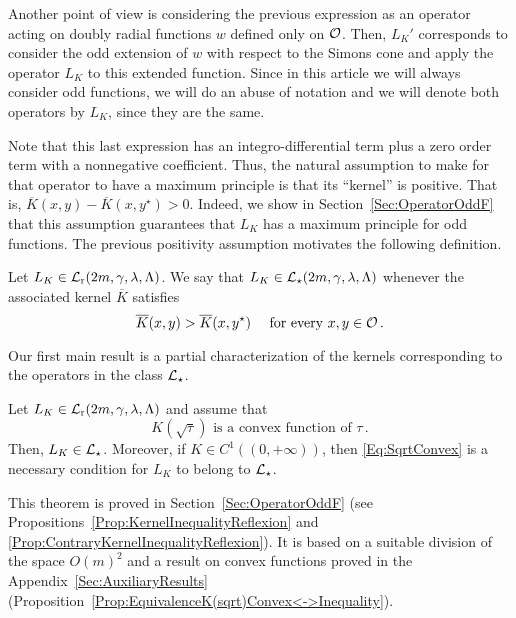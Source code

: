 Another point of view is considering the previous expression as an operator acting on doubly radial functions $w$ defined only on $\mathcal{O}$. Then, $L_K'$ corresponds to consider the odd extension of  $w$ with respect to the Simons cone and apply the operator $L_K$ to this extended function. Since in this article we will always consider odd functions, we will do an abuse of notation and we will denote both operators by $L_K$, since they are the same.

Note that this last expression has an integro-differential term plus a zero order term with a nonnegative coefficient. Thus, the natural assumption to make for that operator to have a maximum principle is that its ``kernel'' is positive. That is, $\overline{K}(x, y) - \overline{K}(x, y^\star)>0$. Indeed, we show in Section~\ref{Sec:OperatorOddF} that this assumption guarantees that $L_K$ has a maximum principle for odd functions. The previous positivity assumption motivates the following definition.

\begin{definition}
	Let $L_K \in \mathcal{L}_{\mathrm{r}}(2m,\gamma,\lambda, \Lambda)$. We say that $L_K\in \mathcal{L}_\star (2m,\gamma,\lambda, \Lambda)$ whenever the associated kernel $\overline{K}$ satisfies
	\begin{equation}
		\label{Eq:KernelInequality}
		\overline{K}(x,y) > \overline{K}(x, y^\star) \quad \text{ for every }x,y \in \mathcal{O}\,.
	\end{equation}
\end{definition}

Our first main result is a partial characterization of the kernels corresponding to the operators in the class $\mathcal{L}_\star$.

\begin{theorem}
	\label{Th:CharacterizationLstar}
	Let $L_K \in \mathcal{L}_{\mathrm{r}}(2m,\gamma,\lambda, \Lambda)$ and assume that 
	\begin{equation}
		\label{Eq:SqrtConvex}	
		K(\sqrt{\tau}) \text{ is a convex function of }\tau\,.
	\end{equation}
	Then, $L_K\in \mathcal{L}_\star$. Moreover, if $K\in C^1((0,+\infty))$, then \eqref{Eq:SqrtConvex} is a necessary condition for $L_K$ to belong to $\mathcal{L}_\star$.
\end{theorem}

This theorem is proved in Section~\ref{Sec:OperatorOddF} (see Propositions~\ref{Prop:KernelInequalityReflexion} and \ref{Prop:ContraryKernelInequalityReflexion}). It is based on a suitable division of the space $O(m)^2$ and a result on convex functions proved in the Appendix~\ref{Sec:AuxiliaryResults} (Proposition~\ref{Prop:EquivalenceK(sqrt)Convex<->Inequality}).

